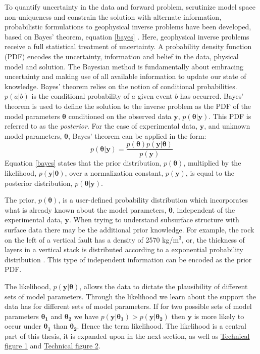 To quantify uncertainty in the data and forward problem, scrutinize model space non-uniqueness and constrain the solution with alternate information, probabilistic formulations to geophysical inverse problems have been developed, based on Bayes' theorem, equation \ref{bayes} \citep{Tarantola1982a,Mosegaard1995,Mosegaard2002,Tarantola2005}. Here, geophysical inverse problems receive a full statistical treatment of uncertainty. A probability density function (PDF) encodes the uncertainty, information and belief in the data, physical model and solution. The Bayesian method is fundamentally about embracing uncertainty and making use of all available information to update our state of knowledge. Bayes' theorem relies on the notion of conditional probabilities. $p(a|b)$ is the conditional probability of $a$ given event $b$ has occurred. Bayes' theorem is used to define the solution to the inverse problem as the PDF of the model parameters $\bm{\theta}$ conditioned on the observed data $\bm{y}$, $p(\bm{\theta}|\bm{y})$. This PDF is referred to as the \textit{posterior}. For the case of experimental data, $\bm{y}$, and unknown model parameters, $\bm{\theta}$, Bayes' theorem can be applied in the form:
\begin{equation}
p(\bm{\theta}|\bm{y}) = \frac{p(\bm{\theta}) p(\bm{y}|\bm{\theta})}{p(\bm{y})}
\label{bayes}
\end{equation}
Equation \ref{bayes} states that the prior distribution, $p(\bm{\theta})$, multiplied by the likelihood, $p(\bm{y}|\bm{\theta})$, over a normalization constant, $p(\bm{y})$, is equal to the posterior distribution, $p(\bm{\theta}|\bm{y})$.\par

The prior, $p(\bm{\theta})$, is a user-defined probability distribution which incorporates what is already known about the model parameters, $\bm{\theta}$, independent of the experimental data, $\bm{y}$. When trying to understand subsurface structure with surface data there may be the additional prior knowledge. For example, the rock on the left of a vertical fault has a density of 2570 kg/m$^3$, or, the thickness of layers in a vertical stack is distributed according to a exponential probability distribution \citep{Mosegaard1995}. This type of independent information can be encoded as the prior PDF.\par

The likelihood, $p(\bm{y}|\bm{\theta})$, allows the data to dictate the plausibility of different sets of model parameters. Through the likelihood we learn about the support the data has for different sets of model parameters. If for two possible sets of model parameters $\bm{\theta_1}$ and $\bm{\theta_2}$ we have $p(\bm{y}|\bm{\theta_1}) > p(\bm{y}|\bm{\theta_2})$ then $\bm{y}$ is more likely to occur under $\bm{\theta_1}$ than $\bm{\theta_2}$. Hence the term likelihood. The likelihood is a central part of this thesis, it is expanded upon in the next section, as well as \hyperref[tf1]{Technical figure 1} and \hyperref[tf2]{Technical figure 2}. \par

